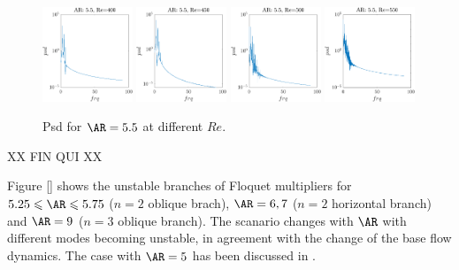 \begin{figure}
  \centering
  \includegraphics[width=0.24\textwidth]{./fig/nnl/psdAR5.5RE400.png}
  \includegraphics[width=0.24\textwidth]{./fig/nnl/psdAR5.5RE450.png}
  \includegraphics[width=0.24\textwidth]{./fig/nnl/psdAR5.5RE500.png}
  \includegraphics[width=0.24\textwidth]{./fig/nnl/psdAR5.5RE550.png}
  \caption{Psd for $\AR=5.5$ at different $Re$.}
  \label{fig:ClCd}
\end{figure}

\iffalse
XX FIN QUI XX

Figure \ref{} shows the unstable branches of Floquet multipliers for $5.25 \le \AR \le 5.75$ ($n=2$ oblique brach), $\AR=6,7$ ($n=2$ horizontal branch) and $\AR=9$ ($n=3$ oblique branch). The scanario changes with $\AR$ with different modes becoming unstable, in agreement with the change of the base flow dynamics. The case with $\AR=5$ has been discussed in \cite{chiarini-quadrio-auteri-2022d}.


